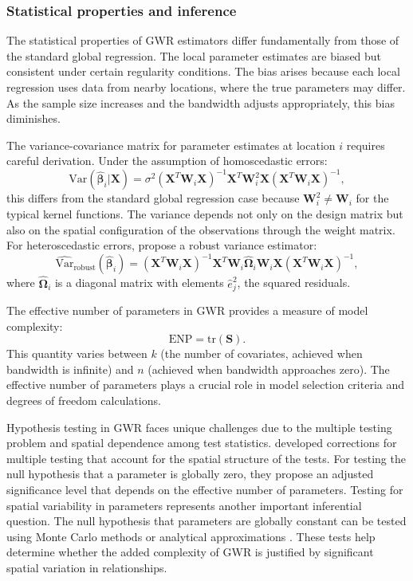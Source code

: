 \documentclass[smallextended, natbib]{svjour3}       %
\begin{document}
\subsubsection*{Statistical properties and inference}

The statistical properties of GWR estimators differ fundamentally from those of the standard global regression. 
The local parameter estimates are biased but consistent under certain regularity conditions. 
The bias arises because each local regression uses data from nearby locations, where the true parameters may differ. 
As the sample size increases and the bandwidth adjusts appropriately, this bias diminishes.

The variance-covariance matrix for parameter estimates at location $i$ requires careful derivation. 
Under the assumption of homoscedastic errors:
$$\text{Var}(\hat{\boldsymbol{\beta}}_i|\mathbf{X}) = \sigma^2(\mathbf{X}^T\mathbf{W}_i\mathbf{X})^{-1}\mathbf{X}^T\mathbf{W}_i^2\mathbf{X}(\mathbf{X}^T\mathbf{W}_i\mathbf{X})^{-1},$$
this differs from the standard global regression case because $\mathbf{W}_i^2 \neq \mathbf{W}_i$ for the typical kernel functions.
The variance depends not only on the design matrix but also on the spatial configuration of the observations through the weight matrix.
For heteroscedastic errors, \cite{Brunsdon1996} propose a robust variance estimator:
$$\widehat{\text{Var}}_{\text{robust}}(\hat{\boldsymbol{\beta}}_i) = (\mathbf{X}^T\mathbf{W}_i\mathbf{X})^{-1}\mathbf{X}^T\mathbf{W}_i\hat{\mathbf{\Omega}}_i\mathbf{W}_i\mathbf{X}(\mathbf{X}^T\mathbf{W}_i\mathbf{X})^{-1},$$
where $\hat{\mathbf{\Omega}}_i$ is a diagonal matrix with elements $\hat{e}_j^2$, the squared residuals.

The effective number of parameters in GWR provides a measure of model complexity:
$$\text{ENP} = \text{tr}(\mathbf{S}).$$
This quantity varies between $k$ (the number of covariates, achieved when bandwidth is infinite) and $n$ (achieved when bandwidth approaches zero). 
The effective number of parameters plays a crucial role in model selection criteria and degrees of freedom calculations.

Hypothesis testing in GWR faces unique challenges due to the multiple testing problem and spatial dependence among test statistics.
\cite{DaSilva2016} developed corrections for multiple testing that account for the spatial structure of the tests. 
For testing the null hypothesis that a parameter is globally zero, they propose an adjusted significance level that depends on the effective number of parameters.
Testing for spatial variability in parameters represents another important inferential question. 
The null hypothesis that parameters are globally constant can be tested using Monte Carlo methods \citep{brunsdon1999some} or analytical approximations \citep{leung2000statistical}. 
These tests help determine whether the added complexity of GWR is justified by significant spatial variation in relationships.
\end{document}
